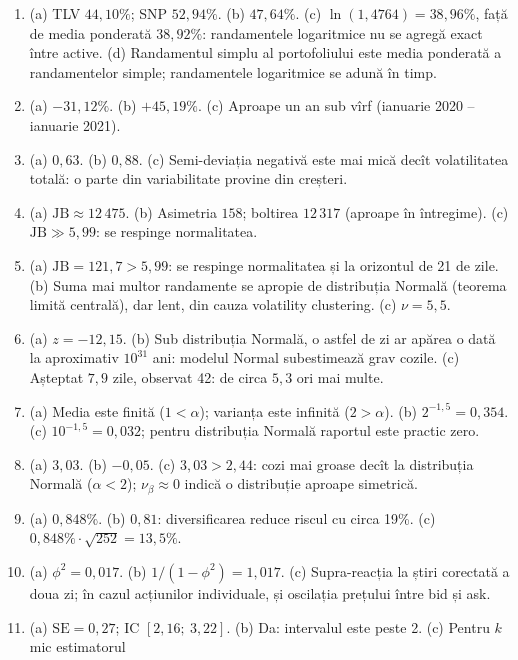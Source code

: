 \documentclass[10.5pt]{article}
\newcommand{\capitol}[1]{\par\vspace{1.4ex}{\large\bfseries\color{spfred}#1}\par\vspace{0.4ex}}
\begin{document}
\clearpage
\capitol{Răspunsuri}
{\small
\begin{enumerate}[label=\textbf{\arabic*.},leftmargin=2.2em,itemsep=0.25ex]
\item (a) TLV $44{,}10\%$; SNP $52{,}94\%$. (b) $47{,}64\%$. (c) $\ln(1{,}4764)=38{,}96\%$, față de media ponderată
$38{,}92\%$: randamentele logaritmice nu se agregă exact între active. (d) Randamentul simplu al portofoliului este
media ponderată a randamentelor simple; randamentele logaritmice se adună în timp.
\item (a) $-31{,}12\%$. (b) $+45{,}19\%$. (c) Aproape un an sub vîrf (ianuarie 2020 -- ianuarie 2021).
\item (a) $0{,}63$. (b) $0{,}88$. (c) Semi-deviația negativă este mai mică decît volatilitatea totală: o parte din
variabilitate provine din creșteri.
\item (a) $\mathrm{JB}\approx 12\,475$. (b) Asimetria $158$; boltirea $12\,317$ (aproape în întregime).
(c) $\mathrm{JB}\gg 5{,}99$: se respinge normalitatea.
\item (a) $\mathrm{JB}=121{,}7>5{,}99$: se respinge normalitatea și la orizontul de 21 de zile. (b) Suma mai
multor randamente se apropie de distribuția Normală (teorema limită centrală), dar lent, din cauza volatility
clustering. (c) $\nu=5{,}5$.
\item (a) $z=-12{,}15$. (b) Sub distribuția Normală, o astfel de zi ar apărea o dată la aproximativ $10^{31}$ ani:
modelul Normal subestimează grav cozile. (c) Așteptat $7{,}9$ zile, observat 42: de circa $5{,}3$ ori mai multe.
\item (a) Media este finită ($1<\alpha$); varianța este infinită ($2>\alpha$). (b) $2^{-1{,}5}=0{,}354$.
(c) $10^{-1{,}5}=0{,}032$; pentru distribuția Normală raportul este practic zero.
\item (a) $3{,}03$. (b) $-0{,}05$. (c) $3{,}03>2{,}44$: cozi mai groase decît la distribuția Normală
($\alpha<2$); $\nu_\beta\approx 0$ indică o distribuție aproape simetrică.
\item (a) $0{,}848\%$. (b) $0{,}81$: diversificarea reduce riscul cu circa 19\%. (c) $0{,}848\%\cdot\sqrt{252}=13{,}5\%$.
\item (a) $\phi^2=0{,}017$. (b) $1/(1-\phi^2)=1{,}017$. (c) Supra-reacția la știri corectată a doua zi; în cazul
acțiunilor individuale, și oscilația prețului între bid și ask.
\item (a) $\mathrm{SE}=0{,}27$; IC $[2{,}16;\ 3{,}22]$. (b) Da: intervalul este peste 2. (c) Pentru $k$ mic estimatorul

\end{enumerate}}
\end{document}

